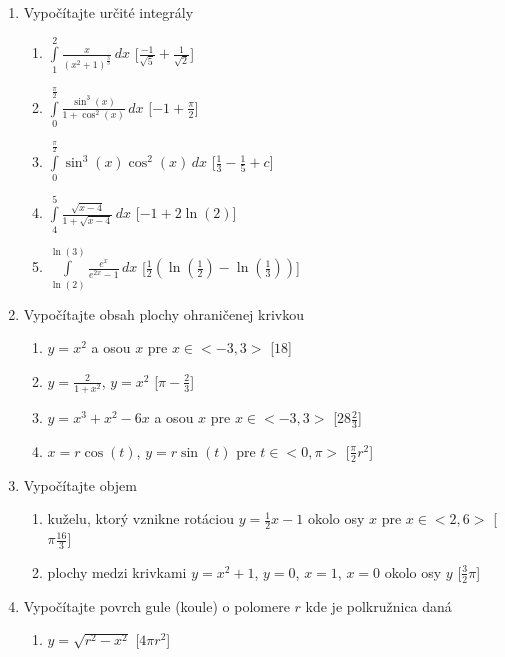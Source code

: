 \begin{enumerate}
\item Vypočítajte určité integrály
\begin{enumerate}
\item{$ \int \limits_1^2 \frac{x}{(x^2+1)^{\frac{3}{3}}} \,dx$} \hspace{\fill} [$\frac{-1}{\sqrt{5}}+\frac{1}{\sqrt{2}}$]
\item{$ \int \limits_0^{\frac{\pi}{2}} \frac{\sin^3(x)}{1+\cos^2(x)} \,dx$} \hspace{\fill} [$-1+\frac{\pi}{2}$]
\item{$ \int \limits_0^{\frac{\pi}{2}} \sin^3(x)\cos^2(x) \,dx$} \hspace{\fill} [$\frac{1}{3}-\frac{1}{5} +c$]
\item{$ \int \limits_4^5 \frac{\sqrt{x-4}}{1+\sqrt{x-4}} \,dx$} \hspace{\fill} [$-1+2\ln(2)$]
\item{$ \int \limits_{\ln(2)}^{\ln(3)} \frac{e^x}{e^{2x}-1} \,dx$} \hspace{\fill} [$\frac{1}{2}(\ln(\frac{1}{2})-\ln(\frac{1}{3}))$]
\end{enumerate}


\item Vypočítajte obsah plochy ohraničenej krivkou
\begin{enumerate}
\item{$ y=x^2$ a osou $x$ pre $x \in <-3,3>$} \hspace{\fill} [$18$]
\item{$ y=\frac{2}{1+x^2}$, $y=x^2$} \hspace{\fill} [$\pi-\frac{2}{3}$]
\item{$ y=x^3+x^2-6x$ a osou $x$ pre $x \in <-3,3>$} \hspace{\fill} [$28\frac{2}{3}$]
\item{$x=r\cos(t)$, $y=r\sin(t)$ pre $t \in <0,\pi>$} \hspace{\fill} [$\frac{\pi}{2}r^2$]
\end{enumerate}


\item Vypočítajte objem
\begin{enumerate}
\item{kuželu, ktorý vznikne rotáciou $y=\frac{1}{2}x-1$ okolo osy $x$ pre $x \in <2,6>$} \hspace{\fill} [$\pi\frac{16}{3}$]
\item{plochy medzi krivkami $ y=x^2+1$, $y=0$, $x=1$, $x=0$ okolo osy $y$} \hspace{\fill} [$\frac{3}{2}\pi$]
\end{enumerate}


\item Vypočítajte povrch gule (koule) o polomere $r$ kde je polkružnica daná 
\begin{enumerate}
\item{$y=\sqrt{r^2-x^2}$} \hspace{\fill} [$4\pi r^2$]
\end{enumerate}

\end{enumerate}